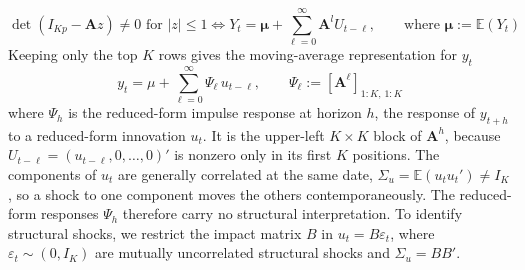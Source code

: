 \begin{equation}
\det(I_{Kp} - \mathbf{A}z) \neq 0 \text{ for } |z| \le 1 \iff Y_t = \mathbf{\mu} +
\sum_{\ell=0}^{\infty}\mathbf{A}^{l}U_{t-\ell}, \qquad \text{where }\mathbf{\mu} := \mathbb{E}(Y_t)
\end{equation}
%
Keeping only the top $K$ rows gives the moving-average representation for $y_t$
%
\begin{equation}
    y_t = \mu + \sum_{\ell=0}^{\infty} \Psi_\ell\, u_{t-\ell},
\qquad \Psi_\ell := [\mathbf{A}^\ell]_{1:K,\,1:K}
    \label{eq:wold_yt}
\end{equation}
%
where $\Psi_h$ is the reduced-form impulse response at horizon $h$, the response of $y_{t+h}$
to a reduced-form innovation $u_t$. It is the upper-left $K \times K$ block of $\mathbf{A}^h$,
because $U_{t-\ell} = (u_{t-\ell}, 0, \ldots, 0)'$ is nonzero only in its first $K$ positions.
The components of $u_t$ are generally correlated at the same date,
$\Sigma_u = \mathbb{E}(u_t u_t') \neq I_K$, so a shock to one component moves the others
contemporaneously. The reduced-form responses $\Psi_h$ therefore carry no structural
interpretation. To identify structural shocks, we restrict the impact matrix $B$ in
$u_t = B\varepsilon_t$, where $\varepsilon_t \sim (0, I_K)$ are mutually uncorrelated structural
shocks and $\Sigma_u = BB'$.


